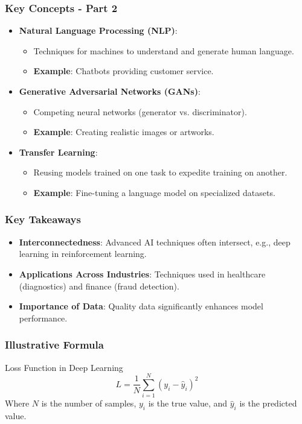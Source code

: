 \documentclass[aspectratio=169]{beamer}
\begin{document}
\begin{frame}[fragile]
    \frametitle{Key Concepts - Part 2}
    \begin{itemize}
        \item \textbf{Natural Language Processing (NLP)}:
        \begin{itemize}
            \item Techniques for machines to understand and generate human language.
            \item \textbf{Example}: Chatbots providing customer service.
        \end{itemize}
        
        \item \textbf{Generative Adversarial Networks (GANs)}:
        \begin{itemize}
            \item Competing neural networks (generator vs. discriminator).
            \item \textbf{Example}: Creating realistic images or artworks.
        \end{itemize}

        \item \textbf{Transfer Learning}:
        \begin{itemize}
            \item Reusing models trained on one task to expedite training on another.
            \item \textbf{Example}: Fine-tuning a language model on specialized datasets.
        \end{itemize}
    \end{itemize}
\end{frame}

\begin{frame}[fragile]
    \frametitle{Key Takeaways}
    \begin{itemize}
        \item \textbf{Interconnectedness}: Advanced AI techniques often intersect, e.g., deep learning in reinforcement learning.
        \item \textbf{Applications Across Industries}: Techniques used in healthcare (diagnostics) and finance (fraud detection).
        \item \textbf{Importance of Data}: Quality data significantly enhances model performance.
    \end{itemize}
\end{frame}

\begin{frame}[fragile]
    \frametitle{Illustrative Formula}
    \begin{block}{Loss Function in Deep Learning}
        \begin{equation}
            L = \frac{1}{N} \sum_{i=1}^{N} (y_i - \hat{y}_i)^2
        \end{equation}
        Where \(N\) is the number of samples, \(y_i\) is the true value, and \(\hat{y}_i\) is the predicted value.
    \end{block}
\end{frame}
\end{document}

